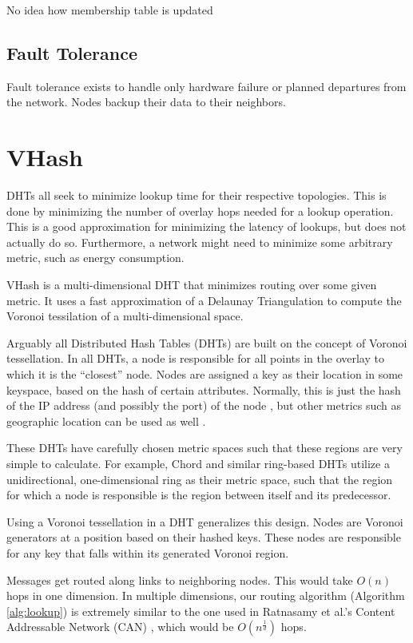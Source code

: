 No idea how membership table is updated

\subsection*{Fault Tolerance}
Fault tolerance exists to handle only hardware failure or planned departures from the network.
Nodes backup their data to their neighbors.


\section{VHash}
DHTs all seek to minimize lookup time for their respective topologies.
This is done by minimizing the number of overlay hops needed for a lookup operation.
This is a good approximation for minimizing the latency of lookups, but does not actually do so.
Furthermore, a network might need to minimize some arbitrary metric, such as energy consumption.

VHash is a multi-dimensional DHT that minimizes routing over some given metric.
It uses a fast approximation of a Delaunay Triangulation to compute the Voronoi tessilation of a multi-dimensional space.



Arguably all Distributed Hash Tables (DHTs) are built on the concept of Voronoi tessellation.
In all DHTs, a node is responsible for all points in the overlay to which it is the ``closest'' node.
Nodes are assigned a key as their location in some keyspace, based on the hash of certain attributes.
Normally, this is just the hash of the IP address (and possibly the port) of the node \cite{chord} \cite{kademlia} \cite{can} \cite{pastry}, but other metrics such as geographic location can be used as well \cite{ratnasamy2002ght}.

These DHTs have carefully chosen metric spaces such that these regions are very simple to calculate.
For example, Chord \cite{chord} and similar ring-based DHTs \cite{manku2003symphony} utilize a unidirectional, one-dimensional ring as their metric space, such that the region for which a node is responsible is the region between itself and its predecessor.

Using a Voronoi tessellation in a DHT generalizes this design. 
Nodes are Voronoi generators at a position based on their hashed keys.
These nodes are responsible for any key that falls within its generated Voronoi region.

Messages get routed along links to neighboring nodes. 
This would take $O(n)$ hops in one dimension.
In multiple dimensions, our routing algorithm (Algorithm \ref{alg:lookup}) is extremely similar to the one used in Ratnasamy et al.'s Content Addressable Network (CAN) \cite{can}, which would be $O(n^{\frac{1}{d}})$ hops.



